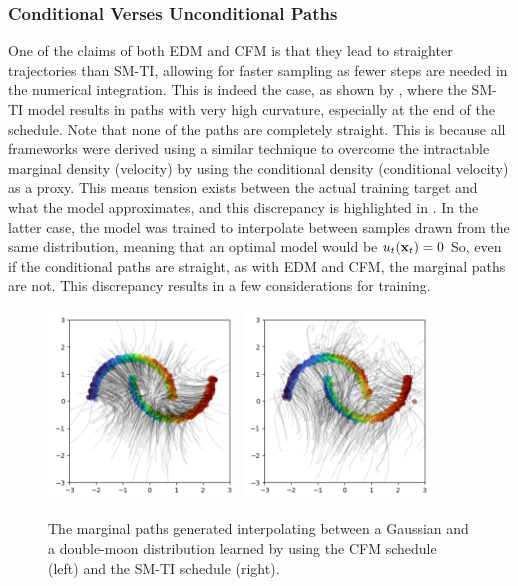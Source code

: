 \subsubsection{Conditional Verses Unconditional Paths}

One of the claims of both EDM and CFM is that they lead to straighter trajectories than SM-TI, allowing for faster sampling as fewer steps are needed in the numerical integration.
This is indeed the case, as shown by , where the SM-TI model results in paths with very high curvature, especially at the end of the schedule.
Note that none of the paths are completely straight.
This is because all frameworks were derived using a similar technique to overcome the intractable marginal density (velocity) by using the conditional density (conditional velocity) as a proxy.
This means tension exists between the actual training target and what the model approximates, and this discrepancy is highlighted in .
In the latter case, the model was trained to interpolate between samples drawn from the same distribution, meaning that an optimal model would be $u_t(\mathbf{x}_t) = 0$
So, even if the conditional paths are straight, as with EDM and CFM, the marginal paths are not.
This discrepancy results in a few considerations for training.

\begin{figure}[ht]
    \centering
    \includegraphics[width=0.45\textwidth]{Figures/generative_models/fm.png}
    \includegraphics[width=0.45\textwidth]{Figures/generative_models/vp.png}
    \caption{The marginal paths generated interpolating between a Gaussian and a double-moon distribution learned by using the CFM schedule (left) and the SM-TI schedule (right).}
    \label{fig:vp_vs_cfm}
\end{figure}

